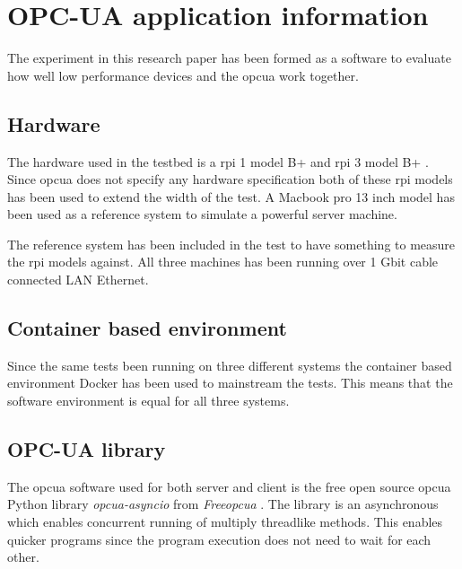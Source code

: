 \section{OPC-UA application information} \label{appImpl}
The experiment in this research paper has been formed as a software to evaluate how well low performance devices and the \acrshort{opcua} work together.


\subsection{Hardware} \label{appImplHardware}
The hardware used in the testbed is a \acrlong{rpi} 1 model B+ \cite{rpi1b} and \acrlong{rpi} 3 model B+ \cite{rpi3b}. Since \acrshort{opcua} does not specify any hardware specification both of these \acrshort{rpi} models has been used to extend the width of the test.
A Macbook pro 13 inch model \cite{mbp13} has been used as a reference system to simulate a powerful server machine.

The reference system has been included in the test to have something to measure the \acrshort{rpi} models against. All three machines has been running over 1 Gbit cable connected LAN Ethernet.


\subsection{Container based environment} \label{appImplSoftware}
Since the same tests been running on three different systems the container based environment Docker \cite{docker} has been used to mainstream the tests. This means that the software environment is equal for all three systems. 


\subsection{OPC-UA library} \label{appImplOpcuaLibrary}
The \acrshort{opcua} software used for both server and client is the free open source \acrshort{opcua} Python library \textit{opcua-asyncio} from \textit{Freeopcua} \cite{freeopcua}. The library is an asynchronous which enables concurrent running of multiply threadlike methods. This enables quicker programs since the program execution does not need to wait for each other.